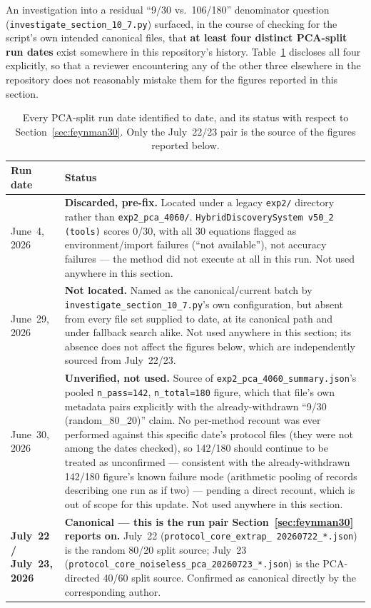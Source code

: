 \documentclass[11pt]{article}
\begin{document}
An investigation into a residual ``9/30 vs.\ 106/180'' denominator
question (\texttt{investigate\_section\_10\_7.py}) surfaced, in the
course of checking for the script's own intended canonical files, that
\textbf{at least four distinct PCA-split run dates} exist somewhere in
this repository's history. Table~\ref{supp:tab:provenance} discloses all
four explicitly, so that a reviewer encountering any of the other three
elsewhere in the repository does not reasonably mistake them for the
figures reported in this section.

\begin{table}[h]
\centering
\caption{Every PCA-split run date identified to date, and its status
with respect to Section~\ref{sec:feynman30}. Only the July~22/23 pair is
the source of the figures reported below.}
\label{supp:tab:provenance}
\begin{tabular}{lp{9.5cm}}
\toprule
Run date & Status \\
\midrule
June~4, 2026 & \textbf{Discarded, pre-fix.} Located under a legacy
\texttt{exp2/} directory rather than \texttt{exp2\_pca\_4060/}.
\texttt{HybridDiscoverySystem v50\_2 (tools)} scores 0/30, with all 30
equations flagged as environment/import failures (``not available''), not
accuracy failures --- the method did not execute at all in this run. Not
used anywhere in this section. \\
June~29, 2026 & \textbf{Not located.} Named as the canonical/current
batch by \texttt{investigate\_section\_10\_7.py}'s own configuration, but
absent from every file set supplied to date, at its canonical path and
under fallback search alike. Not used anywhere in this section; its
absence does not affect the figures below, which are independently
sourced from July~22/23. \\
June~30, 2026 & \textbf{Unverified, not used.} Source of
\texttt{exp2\_pca\_4060\_summary.json}'s pooled \texttt{n\_pass=142},
\texttt{n\_total=180} figure, which that file's own metadata pairs
explicitly with the already-withdrawn ``9/30 (random\_80\_20)'' claim.
No per-method recount was ever performed against this specific date's
protocol files (they were not among the dates checked), so 142/180
should continue to be treated as unconfirmed --- consistent with the
already-withdrawn 142/180 figure's known failure mode (arithmetic
pooling of records describing one run as if two) --- pending a direct
recount, which is out of scope for this update. Not used anywhere in
this section. \\
\textbf{July~22 / July~23, 2026} & \textbf{Canonical --- this is the run
pair Section~\ref{sec:feynman30} reports on.} July~22 (\texttt{protocol\_core\_extrap\_
20260722\_*.json}) is the random 80/20 split source; July~23
(\texttt{protocol\_core\_noiseless\_pca\_20260723\_*.json}) is the
PCA-directed 40/60 split source. Confirmed as canonical directly by the
corresponding author. \\
\bottomrule
\end{tabular}
\end{table}
\end{document}
